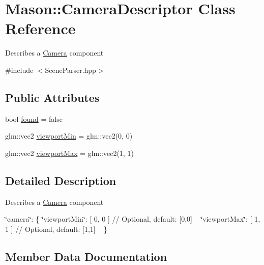 \hypertarget{class_mason_1_1_camera_descriptor}{}\section{Mason\+:\+:Camera\+Descriptor Class Reference}
\label{class_mason_1_1_camera_descriptor}


Describes a \hyperlink{class_mason_1_1_camera}{Camera} component ~\newline
  




{\ttfamily \#include $<$Scene\+Parser.\+hpp$>$}

\subsection*{Public Attributes}
\begin{DoxyCompactItemize}
\item 
bool \hyperlink{class_mason_1_1_camera_descriptor_a51ca9c821b638e93d9406d97a3d50041}{found} = false
\item 
glm\+::vec2 \hyperlink{class_mason_1_1_camera_descriptor_a2d135d0102e435f15cf6a9dde7d64b25}{viewport\+Min} = glm\+::vec2(0, 0)
\item 
glm\+::vec2 \hyperlink{class_mason_1_1_camera_descriptor_ac0a5eb6054280925fbda6a20bb56932d}{viewport\+Max} = glm\+::vec2(1, 1)
\end{DoxyCompactItemize}


\subsection{Detailed Description}
Describes a \hyperlink{class_mason_1_1_camera}{Camera} component ~\newline
 

\char`\"{}camera\char`\"{}\+: \{ \char`\"{}viewport\+Min\char`\"{}\+: \mbox{[} 0, 0 \mbox{]} // Optional, default\+: \mbox{[}0,0\mbox{]} ~\newline
 \char`\"{}viewport\+Max\char`\"{}\+: \mbox{[} 1, 1 \mbox{]} // Optional, default\+: \mbox{[}1,1\mbox{]} ~\newline
 \} 

\subsection{Member Data Documentation}
\hypertarget{class_mason_1_1_camera_descriptor_a51ca9c821b638e93d9406d97a3d50041}{}\label{class_mason_1_1_camera_descriptor_a51ca9c821b638e93d9406d97a3d50041} 
